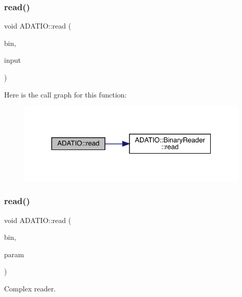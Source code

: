 \subsubsection{\texorpdfstring{read()}{read()}\hspace{0.1cm}{\footnotesize\ttfamily [13/28]}}
{\footnotesize\ttfamily void A\+D\+A\+T\+I\+O\+::read (\begin{DoxyParamCaption}\item[{\mbox{\hyperlink{classADATIO_1_1BinaryReader}{Binary\+Reader}} \&}]{bin,  }\item[{bool \&}]{input }\end{DoxyParamCaption})}

Here is the call graph for this function\+:\nopagebreak
\begin{figure}[H]
\begin{center}
\leavevmode
\includegraphics[width=313pt]{d0/dba/namespaceADATIO_a5f367e2dbd4baac46c87c566b42ce4ce_cgraph}
\end{center}
\end{figure}
\mbox{\label{namespaceADATIO_aa439c7d6dfc63d8424816de24810141d}} 
\subsubsection{\texorpdfstring{read()}{read()}\hspace{0.1cm}{\footnotesize\ttfamily [14/28]}}
{\footnotesize\ttfamily void A\+D\+A\+T\+I\+O\+::read (\begin{DoxyParamCaption}\item[{\mbox{\hyperlink{classADATIO_1_1BinaryReader}{Binary\+Reader}} \&}]{bin,  }\item[{std\+::complex$<$ float $>$ \&}]{param }\end{DoxyParamCaption})}



Complex reader. 

